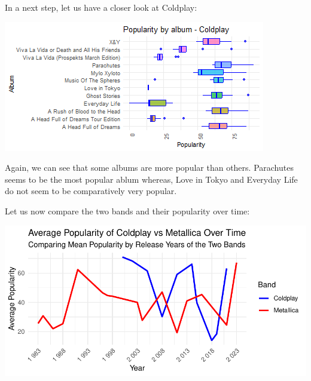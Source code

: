 \documentclass[11pt,preprint, authoryear]{elsarticle}
\let\origfigure\figure
\let\endorigfigure\endfigure
\renewenvironment{figure}[1][2] {
    \expandafter\origfigure\expandafter[H]
} {
    \endorigfigure
}
\numberwithin{equation}{section}
\numberwithin{figure}{section}
\numberwithin{table}{section}
\begin{document}
In a next step, let us have a closer look at Coldplay:

\begin{figure}[H]

{\centering \includegraphics{Question2_files/figure-latex/Figure2-1} 

}

\caption{Popularity by album for Coldplay \label{Figure2}}\label{fig:Figure2}
\end{figure}

Again, we can see that some albums are more popular than others.
Parachutes seems to be the most popular ablum whereas, Love in Tokyo and
Everyday Life do not seem to be comparatively very popular.

Let us now compare the two bands and their popularity over time:

\begin{figure}[H]

{\centering \includegraphics{Question2_files/figure-latex/Figure3-1} 

}

\caption{Average Popularity Scores over Time \label{Figure3}}\label{fig:Figure3}
\end{figure}
\end{document}
